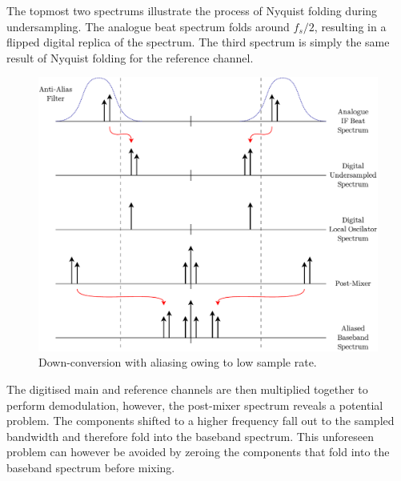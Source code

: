 \documentclass[a4paper,11pt]{report}
\begin{document}
The topmost two spectrums illustrate the process of Nyquist folding during undersampling. The analogue beat spectrum folds around $ f_{s}/2 $, resulting in a flipped digital replica of the spectrum. The third spectrum is simply the same result of Nyquist folding for the reference channel. 
\begin{figure}[h!]
    \begin{center}
        \includegraphics[width=\textwidth]{images/aliased_down_conversion}
        \caption{Down-conversion with aliasing owing to low sample rate.}
        \label{fig:aliased_down_conversion}
    \end{center}
\end{figure}

The digitised main and reference channels are then multiplied together to perform demodulation, however, the post-mixer spectrum reveals a potential problem. The components shifted to a higher frequency fall out to the sampled bandwidth and therefore fold into the baseband spectrum. This unforeseen problem can however be avoided by zeroing the components that fold into the baseband spectrum before mixing.
\end{document}
